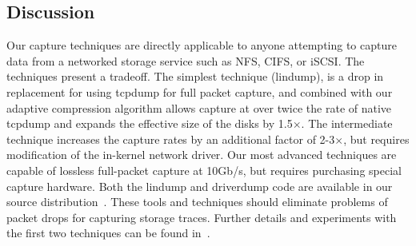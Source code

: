 \subsection{Discussion}

Our capture techniques are directly applicable to anyone attempting to
capture data from a networked storage service such as NFS, CIFS, or
iSCSI.  The techniques present a tradeoff.  The simplest technique
(lindump), is a drop in replacement for using tcpdump for full packet
capture, and combined with our adaptive compression algorithm allows
capture at over twice the rate of native tcpdump and expands the
effective size of the disks by 1.5$\times$.  The intermediate
technique increases the capture rates by an additional factor of
2-3$\times$, but requires modification of the in-kernel network
driver. Our most advanced techniques are capable of lossless
full-packet capture at 10Gb/s, but requires purchasing special capture
hardware.  Both the lindump and driverdump code are available in our
source distribution~\cite{DSOpenSource}.  These tools and techniques
should eliminate problems of packet drops for capturing storage
traces.  Further details and experiments with the first two techniques
can be found in~\cite{Anderson06network-tracing}.

